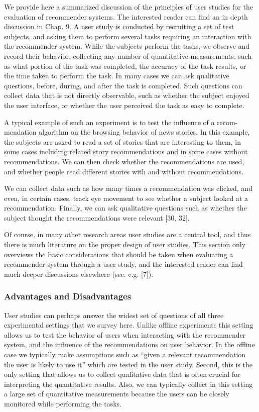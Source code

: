 We provide here a summarized discussion of the principles of user studies for the evaluation of recommender systems. The interested reader can find an in depth discussion in Chap. 9.
A user study is conducted by recruiting a set of test subjects, and asking them to perform several tasks requiring an interaction with the recommender system. While the subjects perform the tasks, we observe and record their behavior, collecting any number of quantitative measurements, such as what portion of the task was completed, the accuracy of the task results, or the time taken to perform the task. In many cases we can ask qualitative questions, before, during, and after the task is completed. Such questions can collect data that is not directly observable, such as whether the subject enjoyed the user interface, or whether the user perceived the task as easy to complete.

A typical example of such an experiment is to test the influence of a recom- mendation algorithm on the browsing behavior of news stories. In this example, the subjects are asked to read a set of stories that are interesting to them, in some cases including related story recommendations and in some cases without recommendations. We can then check whether the recommendations are used, and whether people read different stories with and without recommendations.

We can collect data such as how many times a recommendation was clicked, and even, in certain cases, track eye movement to see whether a subject looked at a recommendation. Finally, we can ask qualitative questions such as whether the subject thought the recommendations were relevant [30, 32].

Of course, in many other research areas user studies are a central tool, and thus there is much literature on the proper design of user studies. This section only overviews the basic considerations that should be taken when evaluating a recommender system through a user study, and the interested reader can find much deeper discussions elsewhere (see. e.g. [7]).

\subsubsection{Advantages and Disadvantages}

User studies can perhaps answer the widest set of questions of all three experimental settings that we survey here. Unlike offline experiments this setting allows us to test the behavior of users when interacting with the recommender system, and the influence of the recommendations on user behavior. In the offline case we typically make assumptions such as “given a relevant recommendation the user is likely to use it” which are tested in the user study. Second, this is the only setting that allows us to collect qualitative data that is often crucial for interpreting the quantitative results. Also, we can typically collect in this setting a large set of quantitative measurements because the users can be closely monitored while performing the tasks.

